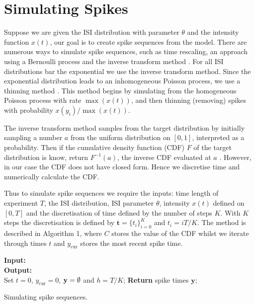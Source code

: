 \documentclass[../main.tex]{subfiles}
\begin{document}
\section{Simulating Spikes}
Suppose we are given the ISI distribution with parameter $\theta$ and the intensity function $x(t)$, our goal is to create spike sequences from the model. There are numerous ways to simulate spike sequences, such as time rescaling, an approach using a Bernoulli process and the inverse transform method \cite{rescale, Truccolo_2005, InvTrans}. For all ISI distributions bar the exponential we use the inverse transform method. Since the exponential distribution leads to an inhomogeneous Poisson process, we use a thinning method \cite{PP}. This method begins by simulating from the homogeneous Poisson process with rate $\max(x(t))$, and then thinning (removing) spikes with probability $x(y_i) / \max(x(t))$. 

The inverse transform method samples from the target distribution by initially sampling a number $a$ from the uniform distribution on $[0,1]$, interpreted as a probability. Then if the cumulative density function (CDF) $F$ of the target distribution is know, return $F^{-1}(a)$, the inverse CDF evaluated at $a$ . However, in our case the CDF does not have closed form. Hence we discretise time and numerically calculate the CDF. 

Thus to simulate spike sequences we require the inputs: time length of experiment $T$, the ISI distribution, ISI parameter $\theta$, intensity $x(t)$ defined on $[0,T]$ and the discretisation of time defined by the number of steps $K$. With $K$ steps the discretisation is defined by $\mathbf{t} = \{ t_i\}^K_{i=0}$ and $t_i = iT/K$. The method is described in Algorithm 1, where $C$ stores the value of the CDF whilst we iterate through times $t$ and $y_{\mathrm{cur}}$ stores the most recent spike time.         

\begin{algorithm}[t]
\DontPrintSemicolon
\textbf{Input:}\\ 
\textbf{Output:}\\
\vspace{0.3cm}
Set $t=0$, $y_{\mathrm{cur}} = 0$, $\mathbf{y} = \emptyset$ and $h = T/K$; \;
\textbf{Return} spike times $\mathbf{y}$; \;
\caption{Simulating spike sequences.}
\end{algorithm}
\end{document}
